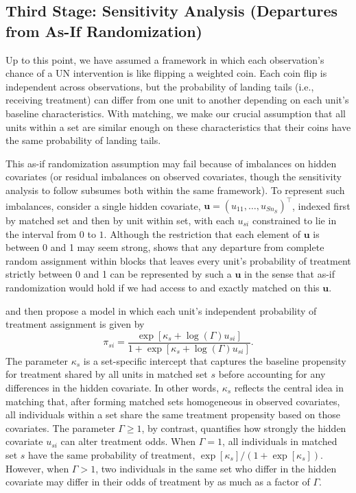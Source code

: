 \documentclass[twoside,11pt]{article}
\begin{document}
\subsection{Third Stage: Sensitivity Analysis (Departures from As-If
Randomization)}\label{part-3-sensitivity-analysis-departures-from-as-if-randomization}

Up to this point, we have assumed a framework in which each
observation's chance of a UN intervention is like flipping a weighted
coin. Each coin flip is independent across observations, but the
probability of landing tails (i.e., receiving treatment) can differ from
one unit to another depending on each unit's baseline characteristics. With
matching, we make our crucial assumption that all units within a set are
similar enough on these characteristics that their coins have the same
probability of landing tails.

This as-if randomization assumption may fail because of imbalances on
hidden covariates (or residual imbalances on observed covariates, though
the sensitivity analysis to follow subsumes both within the same
framework). To represent such imbalances, consider a single hidden
covariate, \(\bm{u} = (u_{11}, \ldots , u_{Sn_S})^{\top}\), indexed
first by matched set and then by unit within set, with each \(u_{si}\)
constrained to lie in the interval from \(0\) to \(1\). Although the
restriction that each element of \(\bm{u}\) is between 0 and 1 may seem
strong, \citet[p.~300, fn.~33]{rosenbaum2017} shows that any departure
from complete random assignment within blocks that leaves every unit's
probability of treatment strictly between 0 and 1 can be represented by
such a \(\bm{u}\) in the sense that as-if randomization would hold if we had
access to and exactly matched on this \(\bm{u}\).

\citet{rosenbaum1987a} and \citet{rosenbaumkrieger1990} then propose a
model in which each unit's independent probability of treatment
assignment is given by \begin{equation}
\label{eq: indiv sens prob}
\pi_{si} = \frac{\exp\left[\kappa_s + \log(\Gamma) u_{si}\right]}{1 + \exp\left[\kappa_s + \log(\Gamma) u_{si}\right]}.
\end{equation} The parameter \(\kappa_s\) is a set-specific intercept
that captures the baseline propensity for treatment shared by all units
in matched set \(s\) before accounting for any differences in the hidden
covariate. In other words, \(\kappa_s\) reflects the central idea in
matching that, after forming matched sets homogeneous in observed
covariates, all individuals within a set share the same treatment
propensity based on those covariates. The parameter \(\Gamma \geq 1\),
by contrast, quantifies how strongly the hidden covariate \(u_{si}\) can
alter treatment odds. When \(\Gamma = 1\), all individuals in matched
set \(s\) have the same probability of treatment,
\(\exp[\kappa_s] / (1 + \exp[\kappa_s])\). However, when \(\Gamma > 1\),
two individuals in the same set who differ in the hidden covariate may
differ in their odds of treatment by as much as a factor of \(\Gamma\).
\end{document}

